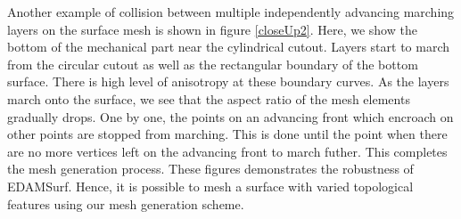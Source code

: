 Another example of collision between multiple independently advancing marching layers on the surface mesh is shown in figure \ref{closeUp2}. Here, we show the bottom of the mechanical part near the cylindrical cutout. Layers start to march from the circular cutout as well as the rectangular boundary of the bottom surface. There is high level of anisotropy at these boundary curves. As the layers march onto the surface, we see that the aspect ratio of the mesh elements gradually drops. One by one, the points on an advancing front which encroach on other points are stopped from marching. This is done until the point when there are no more vertices left on the advancing front to march futher. This completes the mesh generation process. These figures demonstrates the robustness of EDAMSurf. Hence, it is possible to mesh a surface with varied topological features using our mesh generation scheme.

